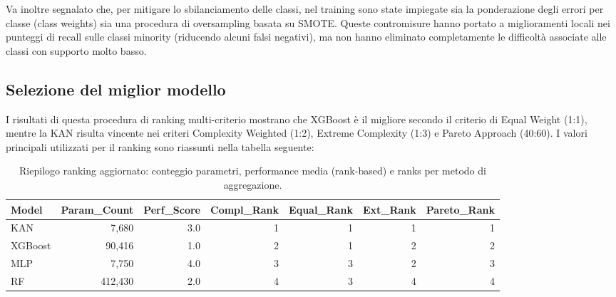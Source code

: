 \documentclass[a4paper,12pt]{report}
\begin{document}
	Va inoltre segnalato che, per mitigare lo sbilanciamento delle classi, nel training sono state impiegate sia la ponderazione degli errori per classe (class weights) sia una procedura di oversampling basata su SMOTE. Queste contromisure hanno portato a miglioramenti locali nei punteggi di recall sulle classi minority (riducendo alcuni falsi negativi), ma non hanno eliminato completamente le difficoltà associate alle classi con supporto molto basso.
	
	\subsection{Selezione del miglior modello}
	I risultati di questa procedura di ranking multi-criterio mostrano che XGBoost è il migliore secondo il criterio di Equal Weight (1:1), mentre la KAN risulta vincente nei criteri Complexity Weighted (1:2), Extreme Complexity (1:3) e Pareto Approach (40:60). I valori principali utilizzati per il ranking sono riassunti nella tabella seguente:
	
	\begin{table}[H]
		\centering
		\setlength{\tabcolsep}{2pt}
		\caption{Riepilogo ranking aggiornato: conteggio parametri, performance media (rank-based) e ranks per metodo di aggregazione.}
		\begin{tabular}{lrrrrrr}
			\toprule
			\textbf{Model} & \textbf{Param\_Count} & \textbf{Perf\_Score} & \textbf{Compl\_Rank} & \textbf{Equal\_Rank} & \textbf{Ext\_Rank} & \textbf{Pareto\_Rank} \\
			\midrule
			KAN       & 7,680    & 3.0 & 1 & 1 & 1 & 1 \\
			XGBoost   & 90,416   & 1.0 & 2 & 1 & 2 & 2 \\
			MLP       & 7,750    & 4.0 & 3 & 3 & 2 & 3 \\
			RF        & 412,430  & 2.0 & 4 & 3 & 4 & 4 \\
			\bottomrule
		\end{tabular}
	\end{table}
	
\end{document}
